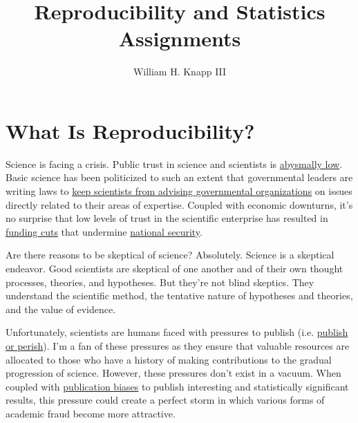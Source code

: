 \documentclass[12pt]{article}
\author{William H. Knapp III}
\title{Reproducibility and Statistics Assignments}
\begin{document}

\maketitle

\section{What Is Reproducibility?}
Science is facing a crisis. Public trust in science and scientists is
\href{http://www.washingtonpost.com/posteverything/wp/2015/01/30/even-in-2015-the-public-doesnt-trust-scientists/}
{abysmally low}. Basic science has been politicized to such an extent that governmental leaders
are writing laws to
\href{http://www.salon.com/2014/11/19/house_republicans_just_passed_a_bill_forbidding_scientists_from_advising_the_epa_on_their_own_research/}
{keep scientists from advising governmental organizations} on issues directly
related to their areas of expertise. Coupled with economic downturns, it's no surprise that low levels of
trust in the scientific enterprise has resulted in \href{http://www.usatoday.com/story/news/nation/2014/04/23/nih-budget-cuts/8056113/}
{funding cuts} that undermine \href{https://books.google.com/books?id=DMzcGe0-HQwC&pg=PA170&lpg=PA170&dq=brain+drain+national+security&source=bl&ots=aLPpwPN5dk&sig=GDHH5pVY9GPZGT65pRTMM-bWuug&hl=en&sa=X&ei=iMQ3VYqoIYvGogS9joGoCw&ved=0CDoQ6AEwBA#v=onepage&q=brain\%20drain\%20national\%20security&f=false}
{national security}.

Are there reasons to be skeptical of science? Absolutely. Science is a skeptical endeavor. Good scientists are skeptical of one another and of
their own thought processes, theories, and hypotheses. But they're not blind skeptics. They understand the scientific method, the tentative
nature of hypotheses and theories, and the value of evidence.

Unfortunately, scientists are humans faced with pressures to publish (i.e. \href{http://en.wikipedia.org/wiki/Publish_or_perish}
{publish or perish}). I'm a fan of these pressures as they ensure that valuable resources are allocated to those who have a history
of making contributions to the gradual progression of science. However, these pressures don't exist in a vacuum. When coupled with
\href{http://en.wikipedia.org/wiki/Publication_bias}{publication biases} to publish interesting and statistically significant results,
this pressure could create a perfect storm in which various forms of academic fraud become more attractive.
\end{document}
